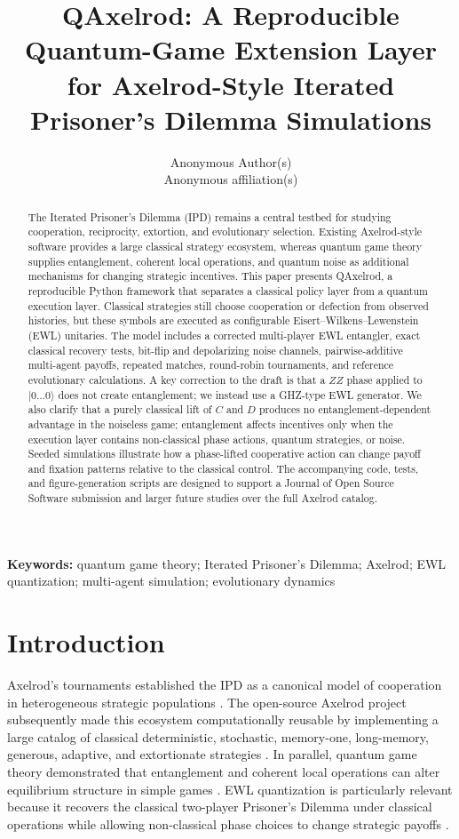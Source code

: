 \documentclass[11pt]{article}
\title{QAxelrod: A Reproducible Quantum-Game Extension Layer for Axelrod-Style Iterated Prisoner's Dilemma Simulations}
\author{Anonymous Author(s)\\Anonymous affiliation(s)}
\date{}
\begin{document}
\maketitle

\begin{abstract}
The Iterated Prisoner's Dilemma (IPD) remains a central testbed for studying cooperation, reciprocity, extortion, and evolutionary selection. Existing Axelrod-style software provides a large classical strategy ecosystem, whereas quantum game theory supplies entanglement, coherent local operations, and quantum noise as additional mechanisms for changing strategic incentives. This paper presents QAxelrod, a reproducible Python framework that separates a classical policy layer from a quantum execution layer. Classical strategies still choose cooperation or defection from observed histories, but these symbols are executed as configurable Eisert--Wilkens--Lewenstein (EWL) unitaries. The model includes a corrected multi-player EWL entangler, exact classical recovery tests, bit-flip and depolarizing noise channels, pairwise-additive multi-agent payoffs, repeated matches, round-robin tournaments, and reference evolutionary calculations. A key correction to the draft is that a $ZZ$ phase applied to $|0\ldots0\rangle$ does not create entanglement; we instead use a GHZ-type EWL generator. We also clarify that a purely classical lift of $C$ and $D$ produces no entanglement-dependent advantage in the noiseless game; entanglement affects incentives only when the execution layer contains non-classical phase actions, quantum strategies, or noise. Seeded simulations illustrate how a phase-lifted cooperative action can change payoff and fixation patterns relative to the classical control. The accompanying code, tests, and figure-generation scripts are designed to support a Journal of Open Source Software submission and larger future studies over the full Axelrod catalog.
\end{abstract}

\noindent\textbf{Keywords:} quantum game theory; Iterated Prisoner's Dilemma; Axelrod; EWL quantization; multi-agent simulation; evolutionary dynamics

\section{Introduction}
Axelrod's tournaments established the IPD as a canonical model of cooperation in heterogeneous strategic populations \cite{Axelrod1984,Axelrod1997}. The open-source Axelrod project subsequently made this ecosystem computationally reusable by implementing a large catalog of classical deterministic, stochastic, memory-one, long-memory, generous, adaptive, and extortionate strategies \cite{Knight2016}. In parallel, quantum game theory demonstrated that entanglement and coherent local operations can alter equilibrium structure in simple games \cite{Eisert1999,Meyer1999,Flitney2002}. EWL quantization is particularly relevant because it recovers the classical two-player Prisoner's Dilemma under classical operations while allowing non-classical phase choices to change strategic payoffs \cite{Eisert1999,Du2002}.
\end{document}
